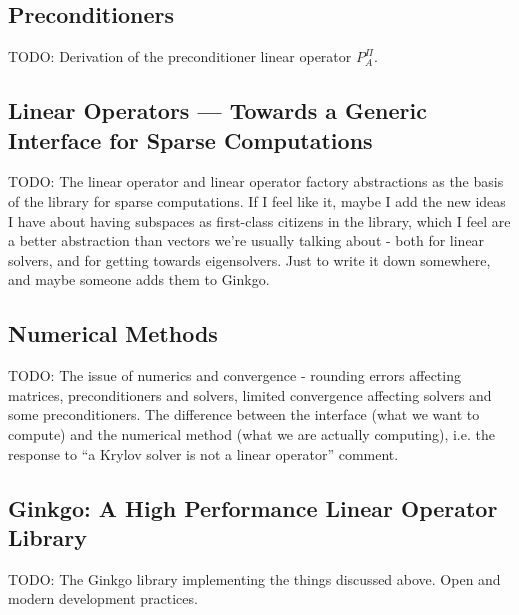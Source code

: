 \subsection{Preconditioners}
TODO: Derivation of the preconditioner linear operator $P^\Pi_A$.

\subsection{Linear Operators --- Towards a Generic Interface for Sparse
            Computations}
TODO: The linear operator and linear operator factory abstractions as the basis
      of the library for sparse computations.
      If I feel like it, maybe I add the new ideas I have about having subspaces
      as first-class citizens in the library, which I feel are a better
      abstraction than vectors we're usually talking about - both for linear
      solvers, and for getting towards eigensolvers. Just to write it down
      somewhere, and maybe someone adds them to Ginkgo.
\subsection{Numerical Methods}
TODO: The issue of numerics and convergence - rounding errors affecting
matrices, preconditioners and solvers, limited convergence affecting solvers and
some preconditioners. The difference between the interface (what we want to
compute) and the numerical method (what we are actually computing), i.e. the
response to ``a Krylov solver is not a linear operator'' comment.

\subsection{Ginkgo: A High Performance Linear Operator Library}
TODO: The Ginkgo library implementing the things discussed above. Open and
modern development practices.

